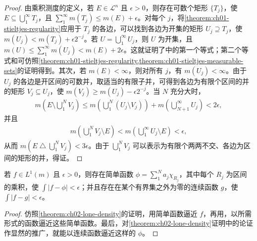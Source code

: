 \documentclass[../../main.tex]{subfiles}%
\begin{document}
\begin{proof}
由乘积测度的定义，若 $E\in\mathscr{L}^n$ 且 $\epsilon>0$，则存在可数个矩形 $\{T_j\}$，使 $E\subseteq\bigcup_1^\infty T_j$，且 $\sum_1^\infty m(T_j)\le m(E)+\epsilon$。对每个 $j$，将\cref{theorem:ch01-stieltjes-regularity}应用于 $T_j$ 的各边，可以找到各边为开集的矩形 $U_j\supseteq T_j$，使 $m(U_j)<m(T_j)+\epsilon2^{-j}$。若 $U=\bigcup_1^\infty U_j$，则 $U$ 为开集，且 $m(U)\le\sum_1^\infty m(U_j)<m(E)+2\epsilon$。这就证明了中的第一个等式；第二个等式和可仿照\cref{theorem:ch01-stieltjes-regularity,theorem:ch01-stieltjes-measurable-sets}的证明得到。其次，若 $m(E)<\infty$，则对所有 $j$，有 $m(U_j)<\infty$。由于 $U_j$ 的各边是开区间的可数并，取适当的有限子并，可得到各边为有限个区间的并的矩形 $V_j\subseteq U_j$，使 $m(V_j)\ge m(U_j)-\epsilon2^{-j}$。当 $N$ 充分大时，
\begin{align*}
m\left(E\setminus\bigcup_1^N V_j\right)
\le m\left(\bigcup_1^N(U_j\setminus V_j)\right)
+m\left(\bigcup_{N+1}^\infty U_j\right)<2\epsilon,
\end{align*}
并且
\begin{align*}
m\left(\bigcup_1^N V_j\setminus E\right)<m\left(\bigcup_1^\infty U_j\setminus E\right)<\epsilon,
\end{align*}
从而 $m(E\mathbin{\triangle}\bigcup_1^N V_j)<3\epsilon$。由于 $\bigcup_1^N V_j$ 可以表示为有限个两两不交、各边为区间的矩形的并，得证。
\end{proof}
\begin{theorem}\label{theorem:ch02-nd-lone-density}
若 $f\in L^1(m)$ 且 $\epsilon>0$，则存在简单函数 $\phi=\sum_1^N a_j\chi_{R_j}$，其中每个 $R_j$ 为区间的乘积，使 $\int|f-\phi|<\epsilon$；并且存在在某个有界集之外为零的连续函数 $g$，使 $\int|f-g|<\epsilon$。
\end{theorem}
\begin{proof}
仿照\cref{theorem:ch02-lone-density}的证明，用简单函数逼近 $f$，再用，以所需形式的函数逼近这些简单函数。最后，对\cref{theorem:ch02-lone-density}证明中的论证作显然的推广，就能以连续函数逼近这样的 $\phi$。
\end{proof}
\end{document}
